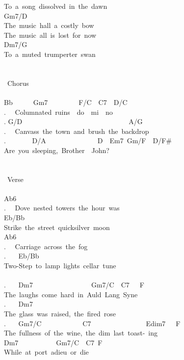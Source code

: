 {To\ a\ song\ dissolved\ in\ the\ dawn\\
Gm7/D\\
The\ music\ hall\ a\ costly\ bow\\
The\ music\ all\ is\ lost\ for\ now\\
Dm7/G\\
To\ a\ muted\ trumperter\ swan\\
\\
\\
\lbrack\ Chorus\rbrack\\
\\
Bb\ \ \ \ \ \ Gm7\ \ \ \ \ \ \ \ \ F/C\ \ C7\ \ D/C\\
. \ \ Columnated\ ruins\ \ do\ \ mi\ \ no\\
. G/D\ \ \ \ \ \ \ \ \ \ \ \ \ \ \ \ \ \ \ \ \ \ \ \ \ \ \ \ \ \ \ A/G\\
. \ \ Canvass\ the\ town\ and\ brush\ the\ backdrop\\
. \ \ \ \ \ \ \ D/A\ \ \ \ \ \ \ \ \ \ \ \ \ \ \ D\ \ Em7\ Gm/F\ \ D/F\#\\
Are\ you\ sleeping,\ Brother\ \ John?\\
\\
\\
\lbrack\ Verse\rbrack\\
\\
Ab6\\
. \ \ Dove\ nested\ towers\ the\ hour\ was\\
Eb/Bb\\
Strike\ the\ street\ quicksilver\ moon\\
Ab6\\
. \ \ Carriage\ across\ the\ fog\\
. \ \ \ Eb/Bb\\
Two-Step\ to\ lamp\ lights\ cellar\ tune\\
\\
. \ \ \ Dm7\ \ \ \ \ \ \ \ \ \ \ \ \ \ \ \ \ Gm7/C\ \ C7\ \ \ F\\
The\ laughs\ come\ hard\ in\ Auld\ Lang\ Syne\\
. \ \ \ Dm7\\
The\ glass\ was\ raised,\ the\ fired\ rose\\
. \ \ \ Gm7/C\ \ \ \ \ \ \ \ \ \ \ \ C7\ \ \ \ \ \ \ \ \ \ \ \ \ \ \ \ Edim7\ \ \ F\\
The\ fullness\ of\ the\ wine,\ the\ dim\ last\ toast-\ ing\\
Dm7\ \ \ \ \ \ \ \ \ \ \ Gm7/C\ \ C7\ F\ \\
While\ at\ port\ adieu\ or\ die\\
}
